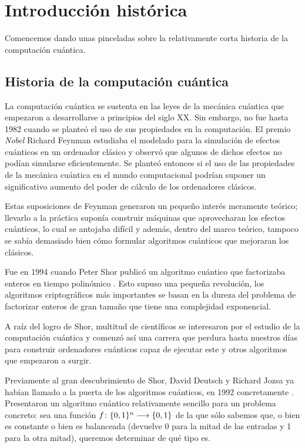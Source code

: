 \chapter{Introducción histórica}

Comencemos dando unas pinceladas sobre la relativamente corta historia de la computación cuántica.

\section{Historia de la computación cuántica}
La computación cuántica se sustenta en las leyes de la mecánica cuántica que empezaron a desarrollarse a principios del siglo XX. Sin embargo, no fue hasta 1982 cuando se planteó el uso de sus propiedades en la computación. El premio \textit{Nobel} Richard Feynman estudiaba el modelado para la simulación de efectos cuánticos en un ordenador clásico y observó que algunos de dichos efectos no podían simularse eficientemente. Se planteó entonces si el uso de las propiedades de la mecánica cuántica en el mundo computacional podrían suponer un significativo aumento del poder de cálculo de los ordenadores clásicos.\autocite{feynman1982modeling}

Estas suposiciones de Feynman generaron un pequeño interés meramente teórico; llevarlo a la práctica suponía construir máquinas que aprovecharan los efectos cuánticos, lo cual se antojaba difícil y además, dentro del marco teórico, tampoco se sabía demasiado bien cómo formular algoritmos cuánticos que mejoraran los clásicos.

Fue en 1994 cuando Peter Shor publicó un algoritmo cuántico que factorizaba enteros en tiempo polinómico \autocite{shor1994algorithms}. Esto supuso una pequeña revolución, los algoritmos criptográficos más importantes se basan en la dureza del problema de factorizar enteros de gran tamaño que tiene una complejidad exponencial.

A raíz del logro de Shor, multitud de científicos se interesaron por el estudio de la computación cuántica y comenzó así una carrera que perdura hasta nuestros días para construir ordenadores cuánticos capaz de ejecutar este y otros algoritmos que empezaron a surgir.

Previamente al gran descubrimiento de Shor, David Deutsch y Richard Jozsa ya habían llamado a la puerta de los algoritmos cuánticos, en 1992 concretamente \autocite{deutsch1992rapid}. Presentaron un algoritmo cuántico relativamente sencillo para un problema concreto: sea una función $f\colon \{0,1\}^n\longrightarrow \{0,1\}$ de la que sólo sabemos que, o bien es constante o bien es balanceada (devuelve 0 para la mitad de las entradas y 1 para la otra mitad), queremos determinar de qué tipo es.

